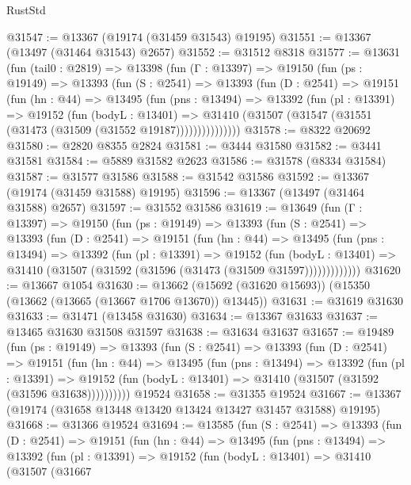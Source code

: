 \begin{lexlean}{RustStd}
\begin{coremodule}
@31547 := @13367 (@19174 (@31459 @31543) @19195)
@31551 := @13367 (@13497 (@31464 @31543) @2657)
@31552 := @31512 @8318
@31577 := @13631
    (fun (tail0 : @2819) =>
    @13398
      (fun (Γ : @13397) =>
      @19150
        (fun (ps : @19149) =>
        @13393
          (fun (S : @2541) =>
          @13393
            (fun (D : @2541) =>
            @19151
              (fun (hn : @44) =>
              @13495
                (fun (pns : @13494) =>
                @13392
                  (fun (pl : @13391) =>
                  @19152
                    (fun (bodyL : @13401) =>
                    @31410 (@31507 (@31547 (@31551 (@31473 (@31509 (@31552 @19187)))))))))))))))
@31578 := @8322 @20692
@31580 := @2820 @8355 @2824
@31581 := @3444 @31580
@31582 := @3441 @31581
@31584 := @5889 @31582 @2623
@31586 := @31578 (@8334 @31584)
@31587 := @31577 @31586
@31588 := @31542 @31586
@31592 := @13367 (@19174 (@31459 @31588) @19195)
@31596 := @13367 (@13497 (@31464 @31588) @2657)
@31597 := @31552 @31586
@31619 := @13649
    (fun (Γ : @13397) =>
    @19150
      (fun (ps : @19149) =>
      @13393
        (fun (S : @2541) =>
        @13393
          (fun (D : @2541) =>
          @19151
            (fun (hn : @44) =>
            @13495
              (fun (pns : @13494) =>
              @13392
                (fun (pl : @13391) =>
                @19152
                  (fun (bodyL : @13401) =>
                  @31410 (@31507 (@31592 (@31596 (@31473 (@31509 @31597)))))))))))))
@31620 := @13667 @1054
@31630 := @13662 (@15692 (@31620 @15693)) (@15350 (@13662 (@13665 (@13667 @1706 @13670)) @13445))
@31631 := @31619 @31630
@31633 := @31471 (@13458 @31630)
@31634 := @13367 @31633
@31637 := @13465 @31630 @31508 @31597
@31638 := @31634 @31637
@31657 := @19489
    (fun (ps : @19149) =>
    @13393
      (fun (S : @2541) =>
      @13393
        (fun (D : @2541) =>
        @19151
          (fun (hn : @44) =>
          @13495
            (fun (pns : @13494) =>
            @13392
              (fun (pl : @13391) =>
              @19152 (fun (bodyL : @13401) => @31410 (@31507 (@31592 (@31596 @31638))))))))))
    @19524
@31658 := @31355 @19524
@31667 := @13367 (@19174 (@31658 @13448 @13420 @13424 @13427 @31457 @31588) @19195)
@31668 := @31366 @19524
@31694 := @13585
    (fun (S : @2541) =>
    @13393
      (fun (D : @2541) =>
      @19151
        (fun (hn : @44) =>
        @13495
          (fun (pns : @13494) =>
          @13392
            (fun (pl : @13391) =>
            @19152
              (fun (bodyL : @13401) =>
              @31410
                (@31507
                  (@31667

\end{coremodule}
\end{lexlean}
